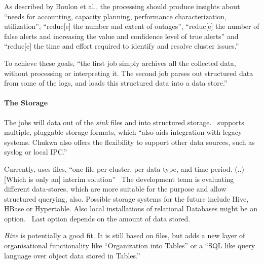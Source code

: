 As described by Boulon et al., the \mr processing should produce insights about 
``needs for accounting, capacity planning, performance characterization, utilization'', 
``reduc[e] the number and extent of outages'', 
``reduc[e] the number of false alerts and increasing the value and confidence level of true alerts'' and 
``reduc[e] the time and effort required to identify and resolve cluster issues.''~\cite{Boulonb}

To achieve these goals, ``the first job simply archives all the collected data, without processing or interpreting it. 
The second job parses out structured data from some of the logs, and loads this structured data into a data store.''~\cite{Boulona} 


\paragraph{The Storage}
\label{par:chukStoreage}
The \mr jobs will \demux data out of the \textit{sink} files and into structured storage.~\cite{Boulonb} 
\chuk supports multiple, pluggable storage formats, which ``also aids integration with legacy systems. Chukwa also offers the flexibility to support other data sources, such as syslog or local IPC.''~\cite{Rabkin2010a} 

Currently, \chuk uses \hdfs files, ``one file per cluster, per data type, and time period. (..) [Which is only an] interim solution''~\cite{Boulona} 
The development team is evaluating different data-stores, which are more suitable for the purpose and allow structured querying, also.
Possible storage systems for the future include Hive, HBase or Hypertable. Also local installations of relational Databases might be an option.~\cite{Boulonb} Last option depends on the amount of data stored.

\textit{Hive} is potentially a good fit. It is still based on \hdfs files, but adds a new layer of organisational functionality like ``Organization into Tables'' or a ``SQL like query language over object data stored in Tables.''~\cite{Sarma08}